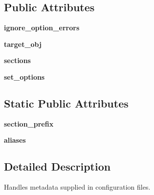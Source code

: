 \subsection*{Public Attributes}
\begin{DoxyCompactItemize}
\item 
\mbox{\label{classsetuptools_1_1config_1_1_config_handler_a5d64dedea13caaf606cde29c6aac8d97}} 
{\bfseries ignore\+\_\+option\+\_\+errors}
\item 
\mbox{\label{classsetuptools_1_1config_1_1_config_handler_aa932a185c0e0fd1d98ebc8bceb88b153}} 
{\bfseries target\+\_\+obj}
\item 
\mbox{\label{classsetuptools_1_1config_1_1_config_handler_a46419994f67045997eeb6dfd75da23d1}} 
{\bfseries sections}
\item 
\mbox{\label{classsetuptools_1_1config_1_1_config_handler_a670721835f76b2148ef5f8b05e51d8f1}} 
{\bfseries set\+\_\+options}
\end{DoxyCompactItemize}
\subsection*{Static Public Attributes}
\begin{DoxyCompactItemize}
\item 
\mbox{\label{classsetuptools_1_1config_1_1_config_handler_a4d832c71e7372fa90bc76a5827de5ed2}} 
{\bfseries section\+\_\+prefix}
\item 
\mbox{\label{classsetuptools_1_1config_1_1_config_handler_a7692b812de7bbc4541531b169036064f}} 
{\bfseries aliases}
\end{DoxyCompactItemize}


\subsection{Detailed Description}
\begin{DoxyVerb}Handles metadata supplied in configuration files.\end{DoxyVerb}
 

